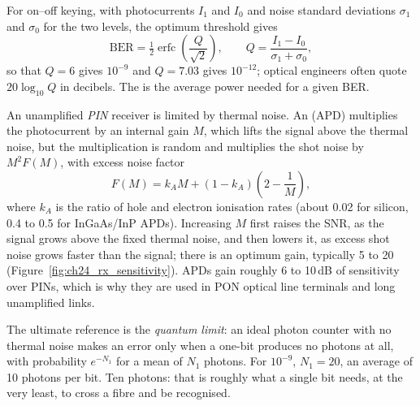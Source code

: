 For on--off keying, with photocurrents $I_1$ and $I_0$ and noise standard deviations $\sigma_1$ and
$\sigma_0$ for the two levels, the optimum threshold gives
\begin{equation}
\mathrm{BER}=\tfrac12\operatorname{erfc}\!\left(\frac{Q}{\sqrt2}\right),\qquad Q=\frac{I_1-I_0}{\sigma_1+\sigma_0},
\label{eq:ch24:qfactor}
\end{equation}
so that $Q=6$ gives $10^{-9}$ and $Q=7.03$ gives $10^{-12}$; optical engineers often quote $20\log_{10}Q$
in decibels. The  is the average power needed for a given BER.


An unamplified \emph{PIN} receiver is limited by thermal noise. An  (APD)
multiplies the photocurrent by an internal gain $M$, which lifts the signal above the thermal noise, but
the multiplication is random and multiplies the shot noise by $M^2F(M)$, with excess noise factor
\begin{equation}
F(M)=k_AM+(1-k_A)\left(2-\frac1M\right),
\end{equation}
where $k_A$ is the ratio of hole and electron ionisation rates (about 0.02 for silicon, 0.4 to 0.5 for
InGaAs/InP APDs). Increasing $M$ first raises the SNR, as the signal grows above the fixed thermal noise,
and then lowers it, as excess shot noise grows faster than the signal; there is an optimum gain,
typically 5 to 20 (Figure~\ref{fig:ch24_rx_sensitivity}). APDs gain roughly 6 to 10\,dB of sensitivity
over PINs, which is why they are used in PON optical line terminals and long unamplified links.

The ultimate reference is the \emph{quantum limit}: an ideal photon counter with no thermal noise makes an
error only when a one-bit produces no photons at all, with probability $e^{-N_1}$ for a mean of $N_1$
photons. For $10^{-9}$, $N_1=20$, an average of 10 photons per bit. Ten photons: that is roughly what a
single bit needs, at the very least, to cross a fibre and be recognised.




